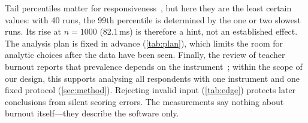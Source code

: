 Tail percentiles matter for responsiveness~\cite{dean2013tail}, but here they are
the least certain values: with 40 runs, the 99th percentile is determined by the
one or two slowest runs. Its rise at $n=1000$ (82.1\,ms) is therefore a hint, not
an established effect. The analysis plan is fixed in advance (\autoref{tab:plan}), which limits the room for
analytic choices after the data have been seen. Finally, the review of teacher burnout reports that prevalence
depends on the instrument~\cite{garciacarmona2019burnout}; within the scope of our
design, this supports analysing all respondents with one instrument and one fixed protocol
(\autoref{sec:method}). Rejecting invalid input (\autoref{tab:edge}) protects later conclusions from
silent scoring errors. The measurements say nothing about burnout itself---they describe the software only.
